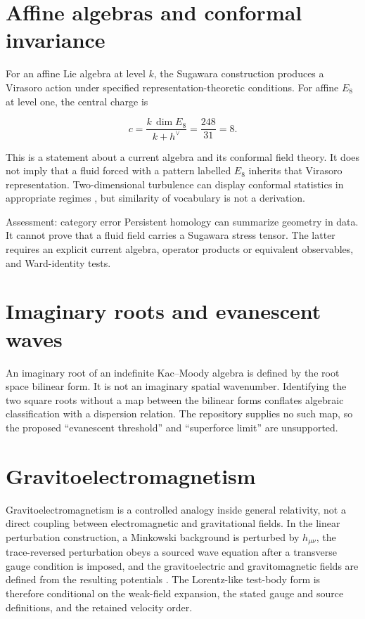 \section{Affine algebras and conformal invariance}

For an affine Lie algebra at level $k$, the Sugawara construction produces a
Virasoro action under specified representation-theoretic conditions. For
affine $E_8$ at level one, the central charge is

\begin{equation}
  c = \frac{k\,\dim E_8}{k+h^{\vee}} = \frac{248}{31}=8.
\end{equation}

This is a statement about a current algebra and its conformal field theory. It
does not imply that a fluid forced with a pattern labelled $E_8$ inherits that
Virasoro representation. Two-dimensional turbulence can display conformal
statistics in appropriate regimes \citep{bernard2006conformal}, but similarity
of vocabulary is not a derivation.

\begin{evidence}{Assessment: category error}
Persistent homology can summarize geometry in data. It cannot prove that a
fluid field carries a Sugawara stress tensor. The latter requires an explicit
current algebra, operator products or equivalent observables, and Ward-identity
tests.
\end{evidence}

\section{Imaginary roots and evanescent waves}

An imaginary root of an indefinite Kac--Moody algebra is defined by the root
space bilinear form. It is not an imaginary spatial wavenumber. Identifying the
two square roots without a map between the bilinear forms conflates algebraic
classification with a dispersion relation. The repository supplies no such
map, so the proposed \enquote{evanescent threshold} and \enquote{superforce
limit} are unsupported.

\section{Gravitoelectromagnetism}

Gravitoelectromagnetism is a controlled analogy inside general relativity, not
a direct coupling between electromagnetic and gravitational fields. In the
linear perturbation construction, a Minkowski background is perturbed by
$h_{\mu\nu}$, the trace-reversed perturbation obeys a sourced wave equation
after a transverse gauge condition is imposed, and the gravitoelectric and
gravitomagnetic fields are defined from the resulting potentials
\citep{mashhoon2008gravitoelectromagnetism}. The Lorentz-like test-body form is
therefore conditional on the weak-field expansion, the stated gauge and source
definitions, and the retained velocity order.

